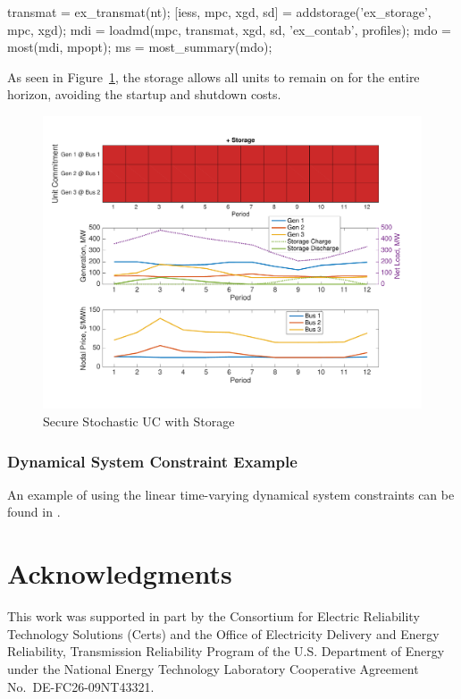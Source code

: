 \documentclass[12pt]{article}
\newcommand{\certs}[0]{{\sc Certs}}
\newcommand{\CERTS}[0]{{Consortium for Electric Reliability Technology Solutions (\certs{})}}
\newcommand{\code}[1]{{\relsize{-0.5}{\tt{{#1}}}}}  %
\numberwithin{equation}{section}
\numberwithin{table}{section}
\numberwithin{figure}{section}
\begin{document}
\begin{Code}
transmat = ex_transmat(nt);
[iess, mpc, xgd, sd] = addstorage('ex_storage', mpc, xgd);
mdi = loadmd(mpc, transmat, xgd, sd, 'ex_contab', profiles);
mdo = most(mdi, mpopt);
ms = most_summary(mdo);
\end{Code}
As seen in Figure~\ref{fig:suc_ex_5}, the storage allows all units to remain on for the entire horizon, avoiding the startup and shutdown costs.
\begin{figure}[hbtp]
  \centering
  \includegraphics[width=\textwidth]{./figures/suc-ex-5}
  \caption{Secure Stochastic UC with Storage}
  \label{fig:suc_ex_5}
\end{figure}

\subsubsection{Dynamical System Constraint Example}
\label{sec:ds_ex}

An example of using the linear time-varying dynamical system constraints can be found in \code{t\_most\_w\_ds.m}.


\clearpage
\section{Acknowledgments}

This work was supported in part by the \CERTS{} and the Office of Electricity Delivery and Energy Reliability, Transmission Reliability Program of the U.S. Department of Energy under the National Energy Technology Laboratory Cooperative Agreement No.~DE-FC26-09NT43321.
\end{document}
